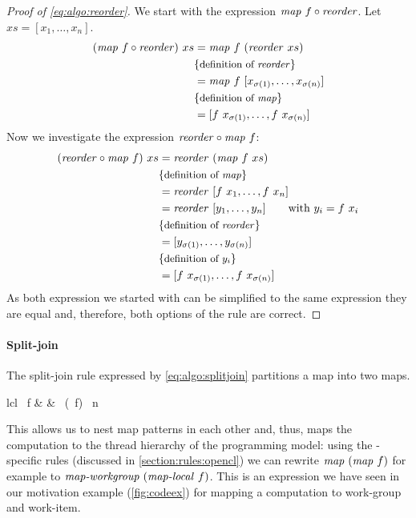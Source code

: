 \begin{proof}[Proof of \autoref{eq:algo:reorder}]
  We start with the expression $\text{\textit{map}}\ f \circ \text{\textit{reorder}}$.
  Let $xs = [x_1, \ldots, x_n]$.
  \begin{align*}
    (\text{\textit{map}}\ f \circ \text{\textit{reorder}})\ xs
      &= \text{\textit{map}}\ f\ (\text{\textit{reorder}}\ xs)\\
      & \{\text{\small definition of \text{\textit{reorder}}}\}\\
      &= \text{\textit{map}}\ f\ [x_{\sigma(1)}, \ldots, x_{\sigma(n)}]\\
      & \{\text{\small definition of \text{\textit{map}}}\}\\
      &= [f\ x_{\sigma(1)}, \ldots, f\ x_{\sigma(n)}]
  \end{align*}
  Now we investigate the expression $\text{\textit{reorder}} \circ \text{\textit{map}}\ f$:
  \begin{align*}
    (\reorder \circ \map\ f)\ xs
      &= \reorder\ (\map\ f\ xs)\\
      & \comment{definition of \map}\\
      &= \reorder\ [f\ x_1, \ldots, f\ x_n]\\
      &= \reorder\ [y_1, \ldots, y_n]\qquad \text{with } y_i = f\ x_i\\
      & \comment{definition of \reorder}\\
      &= [y_{\sigma(1)}, \dots, y_{\sigma(n)}]\\
      & \comment{definition of $y_i$}\\
      &= [f\ x_{\sigma(1)}, \ldots, f\ x_{\sigma(n)}]
  \end{align*}
  As both expression we started with can be simplified to the same expression they are equal and, therefore, both options of the rule are correct.
\end{proof}

\paragraph{Split-join}
The split-join rule expressed by \autoref{eq:algo:splitjoin} partitions a map into two maps.
%
\begin{rerule}{lcl}
  \map\ f
    & \rightarrow &
      \join \circ \map\ (\map\ f) \circ \splitN\ n
  \label{eq:algo:splitjoin}
\end{rerule}
%
This allows us to nest map patterns in each other and, thus, maps the computation to the thread hierarchy of the \OpenCL programming model:
using the \OpenCL-specific rules (discussed in \autoref{section:rules:opencl}) we can rewrite $\text{\textit{map}}\ (\text{\textit{map}}\ f)$ for example to $\text{\textit{map-workgroup}}\ (\text{\textit{map-local}}\ f)$.
This is an expression we have seen in our motivation example (\autoref{fig:codeex}) for mapping a computation to \OpenCL work-group and work-item.


